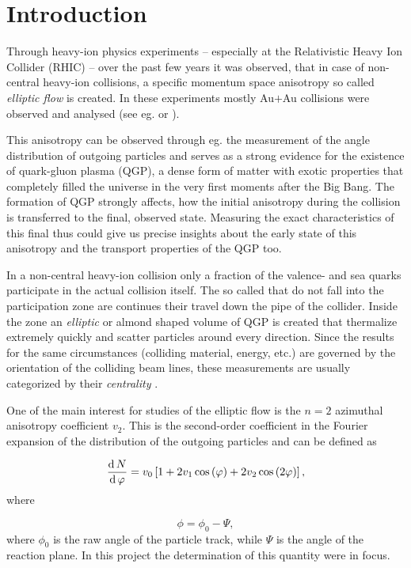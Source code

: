 \section{Introduction} \label{sec:1}
Through heavy-ion physics experiments -- especially at the Relativistic Heavy Ion Collider (RHIC) -- over the past few years it was observed, that in case of non-central heavy-ion collisions, a specific momentum space anisotropy so called \emph{elliptic flow} is created. In these experiments mostly Au$+$Au collisions were observed and analysed (see eg. \cite{Lin2002} or \cite{Collaboration2009}).

This anisotropy can be observed through eg. the measurement of the angle distribution of outgoing particles and serves as a strong evidence for the existence of quark-gluon plasma (QGP), a dense form of matter with exotic properties that completely filled the universe in the very first moments after the Big Bang. The formation of QGP strongly affects, how the initial anisotropy during the collision is transferred to the final, observed state. Measuring the exact characteristics of this final  thus could give us precise insights about the early state of this anisotropy and the transport properties of the QGP too.

In a non-central heavy-ion collision only a fraction of the valence- and sea quarks participate in the actual collision itself. The so called  that do not fall into the participation zone are continues their travel down the pipe of the collider. Inside the zone an \emph{elliptic} or almond shaped volume of QGP is created that thermalize extremely quickly and scatter particles around every direction. Since the results for the same circumstances (colliding material, energy, etc.) are governed by the orientation of the colliding beam lines, these measurements are usually categorized by their \emph{centrality} \citep{Snellings2011}.

One of the main interest for studies of the elliptic flow is the $n=2$ azimuthal anisotropy coefficient $v_{2}$. This is the second-order coefficient in the Fourier expansion of the distribution of the outgoing particles and can be defined as

\begin{equation} \label{eq:1.1}
	\frac{\operatorname{d}{N}}{\operatorname{d}{\varphi}}
	=
	v_{0}
	\left[
		1
		+
		2 v_{1} \cos \left( \varphi \right)
		+
		2 v_{2} \cos \left( 2 \varphi \right)
	\right],
\end{equation}
where

\begin{equation} \label{eq:1.2}
	\phi = \phi_{0} - \Psi,
\end{equation}
where $\phi_{0}$ is the raw angle of the particle track, while $\Psi$ is the angle of the reaction plane. In this project the determination of this quantity were in focus.